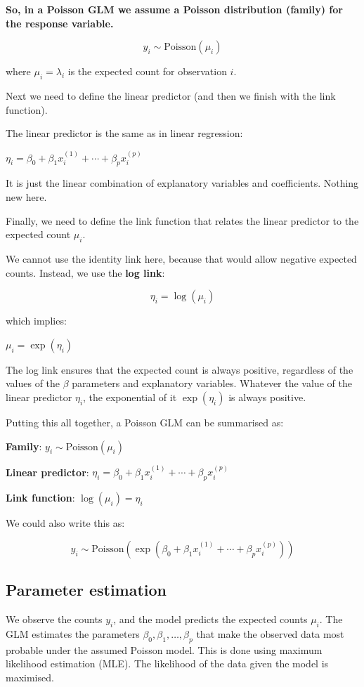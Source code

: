\documentclass[
  letterpaper,
  8pt,
  a4paper]{book}
\begin{document}
\textbf{So, in a Poisson GLM we assume a Poisson distribution (family)
for the response variable.}

\[y_i \sim \text{Poisson}(\mu_i)\]

where \(\mu_i = \lambda_i\) is the expected count for observation \(i\).

Next we need to define the linear predictor (and then we finish with the
link function).

The linear predictor is the same as in linear regression:

\(\eta_i = \beta_0 + \beta_1 x_i^{(1)} + \cdots + \beta_p x_i^{(p)}\)

It is just the linear combination of explanatory variables and
coefficients. Nothing new here.

Finally, we need to define the link function that relates the linear
predictor to the expected count \(\mu_i\).

We cannot use the identity link here, because that would allow negative
expected counts. Instead, we use the \textbf{log link}:

\[\eta_i = \log(\mu_i)\]

which implies:

\(\mu_i = \exp(\eta_i)\)

The log link ensures that the expected count is always positive,
regardless of the values of the \(\beta\) parameters and explanatory
variables. Whatever the value of the linear predictor \(\eta_i\), the
exponential of it \(\exp(\eta_i)\) is always positive.

Putting this all together, a Poisson GLM can be summarised as:

\textbf{Family}: \(y_i \sim \text{Poisson}(\mu_i)\)

\textbf{Linear predictor}:
\(\eta_i = \beta_0 + \beta_1 x_i^{(1)} + \cdots + \beta_p x_i^{(p)}\)

\textbf{Link function}: \(\log(\mu_i) = \eta_i\)

We could also write this as:

\[y_i \sim \mathrm{Poisson}\!\left(\exp\!\left(\beta_0 + \beta_1 x_i^{(1)} + \cdots + \beta_p x_i^{(p)}\right)\right)\]

\subsection*{Parameter estimation}\label{parameter-estimation}

We observe the counts \(y_i\), and the model predicts the expected
counts \(\mu_i\). The GLM estimates the parameters
\(\beta_0, \beta_1, \ldots, \beta_p\) that make the observed data most
probable under the assumed Poisson model. This is done using maximum
likelihood estimation (MLE). The likelihood of the data given the model
is maximised.
\end{document}

